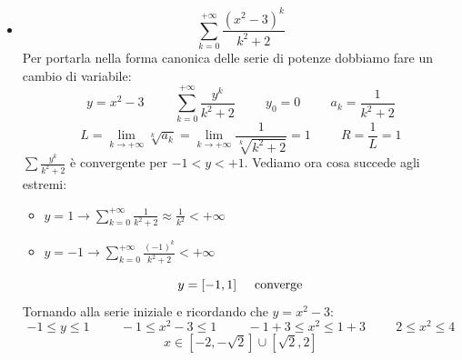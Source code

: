 \begin{example}
\begin{itemize}
         \item \begin{equation*}\sum^{+\infty}_{k=0}\frac{(x^2-3)^k}{k^2+2}\end{equation*}
         Per portarla nella forma canonica delle serie di potenze dobbiamo fare un cambio di variabile:
         \begin{equation*}
             y=x^2-3\hspace{1cm}\sum^{+\infty}_{k=0}\frac{y^k}{k^2+2}\hspace{1cm}y_0=0\hspace{1cm}a_k=\frac{1}{k^2+2}
         \end{equation*}
         \begin{equation*}
             L=\lim_{k\to+\infty}\sqrt[k]{a_k}=\lim_{k\to+\infty}\frac{1}{\sqrt[k]{k^2+2}}=1\hspace{1cm}R=\frac{1}{L}=1
         \end{equation*}
         $\sum\frac{y^k}{k^2+2}$ è convergente per $-1<y<+1$. Vediamo ora cosa succede agli estremi:
         \begin{itemize}
             \item[] $y=1\to\sum^{+\infty}_{k=0}\frac{1}{k^2+2}\approx\frac{1}{k^2}<+\infty$
             \item[] $y=-1\to\sum^{+\infty}_{k=0}\frac{(-1)^k}{k^2+2}<+\infty$
         \end{itemize}\begin{equation*}y=[-1,1]\hspace{0.5cm}\text{converge}\end{equation*}
         Tornando alla serie iniziale e ricordando che $y=x^2-3$:
         \begin{equation*}-1\leq y\leq1\hspace{1cm}-1\leq x^2-3\leq1\hspace{1cm}-1+3\leq x^2\leq 1+3\hspace{1cm}2\leq x^2\leq 4\end{equation*}
         \begin{equation*}x\in[-2,-\sqrt{2}]\cup[\sqrt{2}, 2]\end{equation*}
     \end{itemize}
\end{example}

